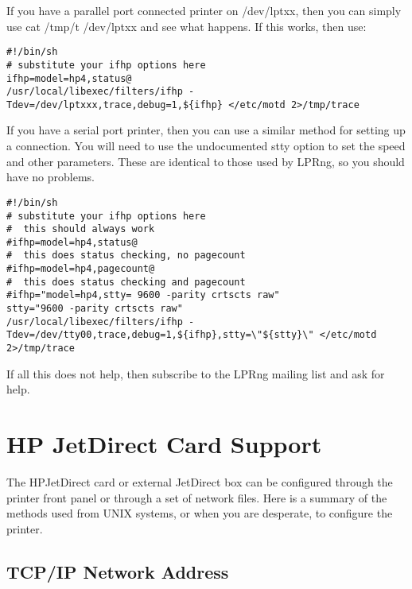 \documentclass[a4paper]{article}
\begin{document}
If you have a parallel port connected printer on {\ttfamily /dev/lptxx},
then you can simply use {\ttfamily cat /tmp/t /dev/lptxx} and see what happens.
If this works, then use:
\begin{tscreen}
\begin{verbatim}
#!/bin/sh
# substitute your ifhp options here
ifhp=model=hp4,status@
/usr/local/libexec/filters/ifhp -Tdev=/dev/lptxxx,trace,debug=1,${ifhp} </etc/motd 2>/tmp/trace
\end{verbatim}
\end{tscreen}


If you have a serial port printer,
then you can use a similar method for setting up a connection.
You will need to use the undocumented {\ttfamily stty} option to set the speed and
other parameters.
These are identical to those used by LPRng, so you should have no problems.
\begin{tscreen}
\begin{verbatim}
#!/bin/sh
# substitute your ifhp options here
#  this should always work
#ifhp=model=hp4,status@
#  this does status checking, no pagecount
#ifhp=model=hp4,pagecount@
#  this does status checking and pagecount
#ifhp="model=hp4,stty= 9600 -parity crtscts raw"
stty="9600 -parity crtscts raw"
/usr/local/libexec/filters/ifhp -Tdev=/dev/tty00,trace,debug=1,${ifhp},stty=\"${stty}\" </etc/motd 2>/tmp/trace
\end{verbatim}
\end{tscreen}


If all this does not help,
then subscribe to the {\ttfamily LPRng} mailing list and ask for help.




\section{HP JetDirect Card Support}

The  HPJetDirect  card or external
JetDirect box can  be configured through the printer front
panel  or through a set of network files.  Here is a summary
of  the  methods  used  from  UNIX  systems, or when you are
desperate, to configure the printer.


\subsection{TCP/IP Network Address}
\end{document}
